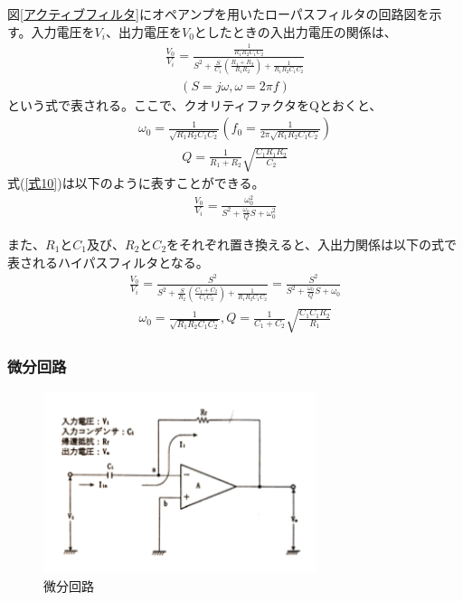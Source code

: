 \documentclass[a4paper,11pt,uplatex]{jsarticle}
\begin{document}
図\ref{アクティブフィルタ}にオペアンプを用いたローパスフィルタの回路図を示す。入力電圧を$V_i$、出力電圧を$V_0$としたときの入出力電圧の関係は、
\begin{align}
  \label{式10}
  \frac{V_0}{V_i} = \frac{\frac{1}{R_1R_2C_1C_2}}{S^2 + \frac{S}{C_1} \left(\frac{R_1 + R_2}{R_1R_2} \right) + \frac{1}{R_1R_2C_1C_2}}
\end{align}
\begin{align}
  \left(S=j\omega, \omega=2\pi f\right) \nonumber
\end{align}
という式で表される。ここで、クオリティファクタをQとおくと、
\begin{align}
  \omega_0 = \frac{1}{\sqrt{R_1R_2C_1C_2}} \left(f_0=\frac{1}{2\pi \sqrt{R_1R_2C_1C_2}}\right)
\end{align}
\begin{align}
  Q = \frac{1}{R_1 + R_2}\sqrt{\frac{C_1R_1R_2}{C_2}}
\end{align}
式(\ref{式10})は以下のように表すことができる。
\begin{align}
	\label{式13}
  \frac{V_0}{V_i} = \frac{\omega_0^2}{S^2 + \frac{\omega_0}{Q}S + \omega_0^2}
\end{align}

また、$R_1$と$C_1$及び、$R_2$と$C_2$をそれぞれ置き換えると、入出力関係は以下の式で表されるハイパスフィルタとなる。
\begin{align}
	\label{式14}
  \frac{V_0}{V_i} = \frac{S^2}{S^2 + \frac{S}{R_2}\left(\frac{C_1+C_2}{C_1C_2}\right) + \frac{1}{R_1R_2C_1C_2}}
  =\frac{S^2}{S^2+\frac{\omega_0}{Q}S +\omega_0}
\end{align}
\begin{align}
  \omega_0 = \frac{1}{\sqrt{R_1R_2C_1C_2}}, Q = \frac{1}{C_1 + C_2}\sqrt{\frac{C_1C_1R_2}{R_1}}
\end{align}

\subsubsection{微分回路}
\begin{figure}[H]
	\begin{center}
		\includegraphics[width=8cm]{画像/微分回路.png}
		\caption{微分回路}
		\label{微分回路}
	\end{center}
\end{figure}
\end{document}
